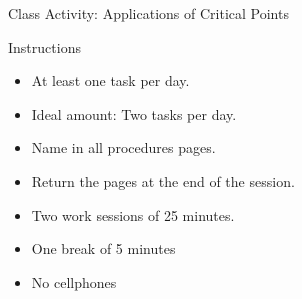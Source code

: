 \documentclass[../tufte-style.tex]{standalone}
\begin{document}
\date{March 17, 2026}

\begin{frame}{Class Activity: Applications of Critical Points}
    \begin{block}{Instructions}
        \begin{itemize}
            \item At least one task per day.
            \item Ideal amount: Two tasks per day.
            \item Name in all procedures pages.
            \item Return the pages at the end of the session.
            \item Two work sessions of 25 minutes.
            \item One break of 5 minutes
            \item No cellphones
        \end{itemize}
    \end{block}
\end{frame}
\end{document}
